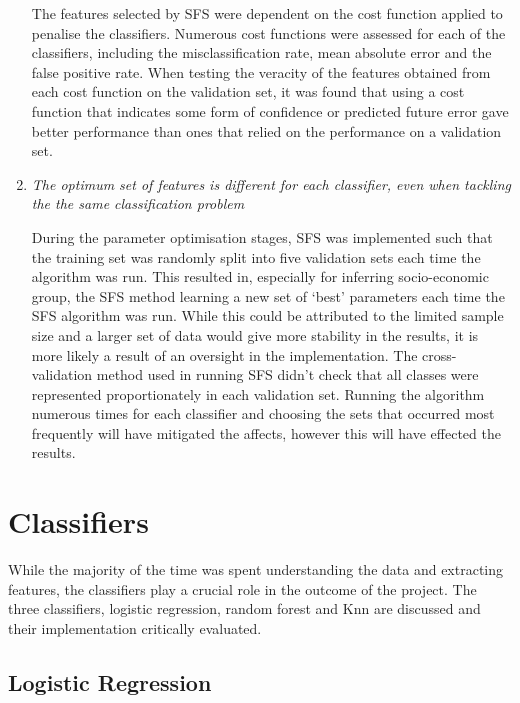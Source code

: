 \begin{enumerate}
The features selected by SFS were dependent on the cost function applied to penalise the classifiers.  Numerous cost functions were assessed for each of the classifiers, including the misclassification rate, mean absolute error and the false positive rate. When testing the veracity of the features obtained from each cost function on the validation set, it was found that using a cost function that indicates some form of confidence or predicted future error gave better performance than ones that relied on the performance on a validation set.


\item \textit{The optimum set of features is different for each classifier, even when tackling the the same classification problem}

During the parameter optimisation stages, SFS was implemented such that the training set was randomly split into five validation sets each time the algorithm was run. This resulted in, especially for inferring socio-economic group, the SFS method learning a new set of `best' parameters each time the SFS algorithm was run. While this could be attributed to the limited sample size and a larger set of data would give more stability in the results, it is more likely a result of an oversight in the implementation. The cross-validation method used in running SFS didn't check that all classes were represented proportionately in each validation set. Running the algorithm numerous times for each classifier and choosing the sets that occurred most frequently will have mitigated the affects, however this will have effected the results. 
\end{enumerate}

\section{Classifiers}

While the majority of the time was spent understanding the data and extracting features, the classifiers play a crucial role in the outcome of the project.  The three classifiers, logistic regression, random forest and Knn are discussed and their implementation critically evaluated.

\subsection{Logistic Regression}

